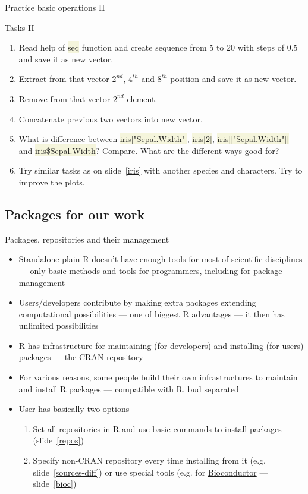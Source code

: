 \documentclass[compress, ucs, xelatex, 11pt, xcolor=svgnames, aspectratio=169,
	hyperref={
		bookmarks=true,
		unicode=true,
		colorlinks=true,
		pdftitle={Molecular data in R},
		plainpages=false,
		pdfauthor={Vojtech Zeisek},
		pdfsubject={Course about phylogeny and evolution in R},
		pdfcreator={XeLaTeX},
		pdfkeywords={R, evolution, phylogeny, molecular data},
		linkcolor=Crimson, %
		anchorcolor=Magenta, %
		citecolor=Magenta, %
		filecolor=Magenta, %
		menucolor=Magenta, %
		urlcolor=DodgerBlue, %
		pdftex},
	url={hyphens, lowtilde} %
	]{beamer}
\renewcommand{\texttt}[1]{\colorbox{Beige}{{\ttfamily #1}}}
\begin{document}
\begin{frame}{Practice basic operations II}
	\begin{exampleblock}{Tasks II}
		\begin{enumerate}
			\item Read help of \texttt{seq} function and create sequence from 5 to 20 with steps of 0.5 and save it as new vector.
			\item Extract from that vector $2^{nd}$, $4^{th}$ and $8^{th}$ position and save it as new vector.
			\item Remove from that vector $2^{nd}$ element.
			\item Concatenate previous two vectors into new vector.
			\item What is difference between \texttt{iris["Sepal.Width"]}, \texttt{iris[2]}, \texttt{iris[["Sepal.Width"]]} and \texttt{iris\$Sepal.Width}? Compare. What are the different ways good for?
			\item Try similar tasks as on slide~\ref{iris} with another species and characters. Try to improve the plots.
		\end{enumerate}
	\end{exampleblock}
\end{frame}

\subsection{Packages for our work}

\begin{frame}{Packages, repositories and their management}
	\begin{itemize}
		\item Standalone plain R doesn't have enough tools for most of scientific disciplines --- only basic methods and tools for programmers, including for package management
		\item Users/developers contribute by making extra packages extending computational possibilities --- one of biggest R advantages --- it then has unlimited possibilities
		\item R has infrastructure for maintaining (for developers) and installing (for users) packages --- the \href{https://CRAN.R-project.org/}{CRAN} repository
		\item For various reasons, some people build their own infrastructures to maintain and install R packages --- compatible with R, bud separated
		\item User has basically two options
		\begin{enumerate}
			\item Set all repositories in R and use basic commands to install packages (slide~\ref{repos})
			\item Specify non-CRAN repository every time installing from it (e.g. slide~\ref{sources-diff}) or use special tools (e.g. for \href{https://bioconductor.org/install/}{Bioconductor} --- slide~\ref{bioc})
		\end{enumerate}
	\end{itemize}
\end{frame}
\end{document}
